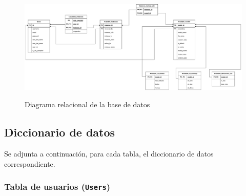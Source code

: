 \begin{landscape}
	\begin{figure}[h]
		\caption[Diagrama: relacional]{Diagrama relacional de la base de datos}
		\centering
		\includegraphics[scale=0.46]{../img/anexos/diagrams/relational}
		\label{c:diagrama-relacional}
	\end{figure}
\end{landscape}

\subsection{Diccionario de datos}

Se adjunta a continuación, para cada tabla, el diccionario de datos correspondiente. \label{c:diccionario_datos}

\subsubsection{Tabla de usuarios (\texttt{Users})}

